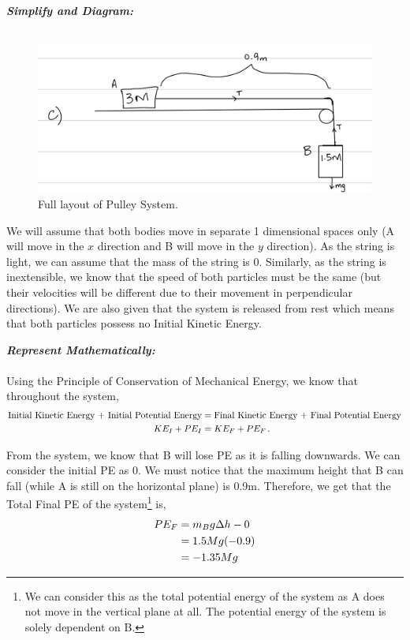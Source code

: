 \begin{subquestions}
\textbf{\textit{Simplify and Diagram:}} \\ \\
\begin{figure}[H]
	\begin{center}
		\includegraphics[scale=0.25]{../2015/figures/2015q6-3}
		\caption{\label{2015:q6:fig:Diagram3} Full layout of Pulley System.}
	\end{center}
\end{figure}
We will assume that both bodies move in separate 1 dimensional spaces only (A will move in the $x$ direction and B will move in the $y$ direction). As the string is light, we can assume that the mass of the string is 0. Similarly, as the string is inextensible, we know that the speed of both particles must be the same (but their velocities will be different due to their movement in perpendicular directions). We are also given that the system is released from rest which means that both particles possess no Initial Kinetic Energy.
	
	
	
	
\textbf{\textit{Represent Mathematically:}} \\ \\
Using the Principle of Conservation of Mechanical Energy, we know that throughout the system,
\begin{align}
	\text{Initial Kinetic Energy + Initial Potential Energy} & = \text{Final Kinetic Energy + Final Potential Energy} \nonumber \\
	KE_I + PE_I & = KE_F + PE_F \,. \label{2015:q6:energy1}
\end{align}

From the system, we know that B will lose PE as it is falling downwards. We can consider the initial PE as 0. We must notice that the maximum height that B can fall (while A is still on the horizontal plane) is 0.9m. Therefore, we get that the Total Final PE of the system\footnote{We can consider this as the total potential energy of the system as A does not move in the vertical plane at all. The potential energy of the system is solely dependent on B.} is,
\begin{align}
	PE_F &  = m_Bg\Delta h - 0 \nonumber \\
	          & = 1.5Mg(-0.9) \nonumber \\
	          & = -1.35Mg
\end{align}


\end{subquestions}
